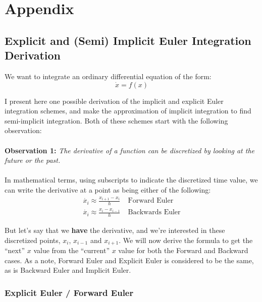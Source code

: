 \documentclass[]{article}
\begin{document}
\section{Appendix}

\subsection{Explicit and (Semi) Implicit Euler Integration Derivation}

We want to integrate an ordinary differential equation of the form:
\begin{equation}
	\dot{x} = f(x)
\end{equation}

I present here one possible derivation of the implicit and explicit Euler integration schemes, and make the approximation of implicit integration to find semi-implicit integration. Both of these schemes start with the following observation:

\paragraph{}
\textbf{Observation 1:} \emph{The derivative of a function can be discretized by looking at the future or the past.}
\paragraph{}
In mathematical terms, using subscripts to indicate the discretized time value, we can write the derivative at a point as being either of the following:
\begin{eqnarray}
	\dot{x_i} \approx \frac{x_{i+1} - x_i}{h} \;&\text{Forward Euler} \label{fwdEuler}\\
	\dot{x_i} \approx \frac{x_{i} - x_{i-1}}{h} \;&\text{Backwards Euler} \label{bwdEuler}
\end{eqnarray}

But let's say that we \textbf{have} the derivative, and we're interested in these discretized points, $x_i$, $x_{i-1}$ and $x_{i+1}$. We will now derive the formula to get the ``next'' $x$ value from the ``current'' $x$ value for both the Forward and Backward cases. As a note, Forward Euler and Explicit Euler is considered to be the same, as is Backward Euler and Implicit Euler.

\subsubsection{Explicit Euler / Forward Euler}
\end{document}
